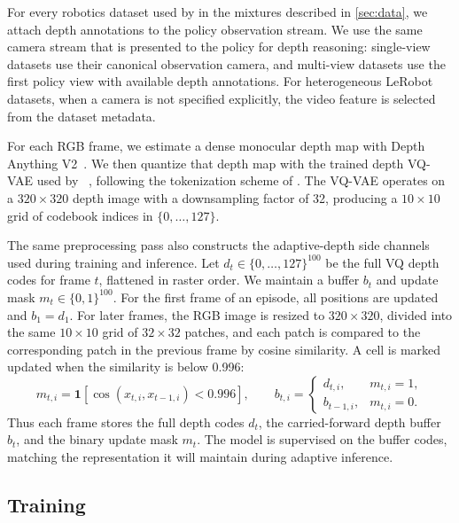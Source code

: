 For every robotics dataset used by \molmothink in the mixtures described in
\autoref{sec:data}, we attach depth annotations to the policy observation
stream. We use the same camera stream that is presented to the policy for depth
reasoning: single-view datasets use their canonical observation camera,
and multi-view datasets use the first policy view with available depth annotations. For heterogeneous LeRobot datasets, when a camera is not specified
explicitly, the video feature is selected from the dataset metadata.

For each RGB frame, we estimate a dense monocular depth map with Depth Anything
V2~\citep{depth_anything_v2}. We then quantize that depth map with the trained
depth VQ-VAE used by \molmoact~\citep{lee2025molmoactactionreasoningmodels},
following the tokenization scheme of \citet{ning2023tokensunifyingoutputspace}.
The VQ-VAE operates on a \(320 \times 320\) depth image with a downsampling
factor of 32, producing a \(10 \times 10\) grid of codebook indices in
\(\{0,\ldots,127\}\).

The same preprocessing pass also constructs the adaptive-depth side channels
used during training and inference. Let \(d_t \in \{0,\ldots,127\}^{100}\) be
the full VQ depth codes for frame \(t\), flattened in raster order. We maintain
a buffer \(b_t\) and update mask \(m_t \in \{0,1\}^{100}\). For the first frame
of an episode, all positions are updated and \(b_1=d_1\). For later frames, the
RGB image is resized to \(320 \times 320\), divided into the same \(10 \times
10\) grid of \(32 \times 32\) patches, and each patch is compared to the
corresponding patch in the previous frame by cosine similarity. A cell is
marked updated when the similarity is below 0.996:
\begin{equation}
    m_{t,i}
    =
    \mathbf{1}
    \left[
        \cos(x_{t,i}, x_{t-1,i}) < 0.996
    \right],
    \qquad
    b_{t,i}
    =
    \begin{cases}
    d_{t,i}, & m_{t,i}=1, \\
    b_{t-1,i}, & m_{t,i}=0.
    \end{cases}
\end{equation}
Thus each frame stores the full depth codes \(d_t\), the carried-forward depth
buffer \(b_t\), and the binary update mask \(m_t\). The model is supervised on
the buffer codes, matching the representation it will maintain during adaptive
inference.

\subsection{Training}
\label{sec:think-training}

